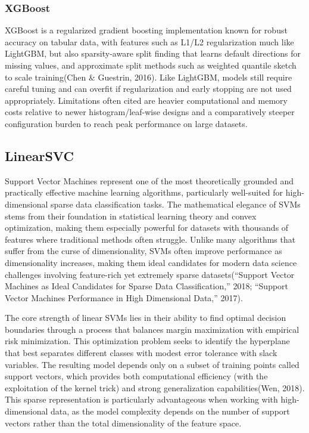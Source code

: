 \documentclass[
  titlepage]{article}
\begin{document}
\subsubsection{XGBoost}\label{xgboost}

XGBoost is a regularized gradient boosting implementation known for
robust accuracy on tabular data, with features such as L1/L2
regularization much like LightGBM, but also sparsity-aware split finding
that learns default directions for missing values, and approximate split
methods such as weighted quantile sketch to scale training(Chen \&
Guestrin, 2016). Like LightGBM, models still require careful tuning and
can overfit if regularization and early stopping are not used
appropriately. Limitations often cited are heavier computational and
memory costs relative to newer histogram/leaf-wise designs and a
comparatively steeper configuration burden to reach peak performance on
large datasets.

\subsection{LinearSVC}\label{linearsvc}

Support Vector Machines represent one of the most theoretically grounded
and practically effective machine learning algorithms, particularly
well-suited for high-dimensional sparse data classification tasks. The
mathematical elegance of SVMs stems from their foundation in statistical
learning theory and convex optimization, making them especially powerful
for datasets with thousands of features where traditional methods often
struggle. Unlike many algorithms that suffer from the curse of
dimensionality, SVMs often improve performance as dimensionality
increases, making them ideal candidates for modern data science
challenges involving feature-rich yet extremely sparse
datasets({``Support Vector Machines as Ideal Candidates for Sparse Data
Classification,''} 2018; {``Support Vector Machines Performance in High
Dimensional Data,''} 2017).

The core strength of linear SVMs lies in their ability to find optimal
decision boundaries through a process that balances margin maximization
with empirical risk minimization. This optimization problem seeks to
identify the hyperplane that best separates different classes with
modest error tolerance with slack variables. The resulting model depends
only on a subset of training points called support vectors, which
provides both computational efficiency (with the exploitation of the
kernel trick) and strong generalization capabilities(Wen, 2018). This
sparse representation is particularly advantageous when working with
high-dimensional data, as the model complexity depends on the number of
support vectors rather than the total dimensionality of the feature
space.
\end{document}

